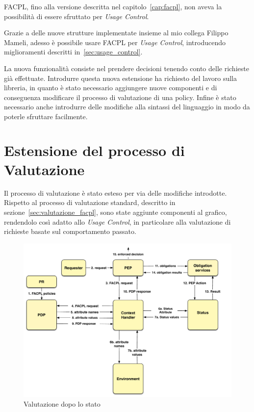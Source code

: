 \label{cap:usagecontrolfacpl}
FACPL, fino alla versione descritta nel capitolo~\ref{cap:facpl}, non aveva la possibilità
di essere sfruttato per \textit{Usage Control}. \par
Grazie a delle nuove strutture implementate insieme al mio collega Filippo Mameli, adesso è possibile
usare FACPL per \textit{Usage Control}, introducendo miglioramenti descritti in~\ref{sec:usage_control}.\\ \par
La nuova funzionalità consiste nel prendere decisioni tenendo conto delle richieste già effettuate.
Introdurre questa nuova estensione ha richiesto del lavoro sulla libreria, in quanto è stato necessario aggiungere
nuove componenti e di conseguenza modificare il processo di valutazione di una policy.
Infine è stato necessario anche introdurre delle modifiche alla sintassi del linguaggio in modo da poterle sfruttare 
facilmente.

\section{Estensione del processo di Valutazione} %
\label{sec:estensione_del_processo_di_valutazione}
Il processo di valutazione è stato esteso per via delle modifiche introdotte. 
Rispetto al processo di valutazione standard, descritto in sezione~\ref{sec:valutazione_facpl}, sono state aggiunte
componenti al grafico, rendendolo così adatto allo \textit{Usage Control}, in particolare alla valutazione di 
richieste basate sul comportamento passato.
\begin{figure}[H]
 \centering 
	\includegraphics[scale = 0.5]{./Chapters/Image/evalvect.pdf}
 \caption{Valutazione dopo lo stato}
 \label{fig:evalStatus}
\end{figure}

